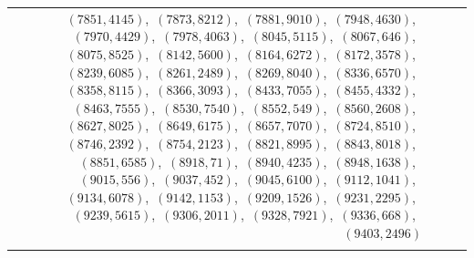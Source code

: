 \documentclass[11pt]{article}
\begin{document}
\begin{longtable}{@{}rrl>{\raggedright\arraybackslash}p{}@{}}
$(7851,4145)$,\allowbreak\ $(7873,8212)$,\allowbreak\ $(7881,9010)$,\allowbreak\ $(7948,4630)$,\allowbreak\ $(7970,4429)$,\allowbreak\ $(7978,4063)$,\allowbreak\ $(8045,5115)$,\allowbreak\ $(8067,646)$,\allowbreak\ $(8075,8525)$,\allowbreak\ $(8142,5600)$,\allowbreak\ $(8164,6272)$,\allowbreak\ $(8172,3578)$,\allowbreak\ $(8239,6085)$,\allowbreak\ $(8261,2489)$,\allowbreak\ $(8269,8040)$,\allowbreak\ $(8336,6570)$,\allowbreak\ $(8358,8115)$,\allowbreak\ $(8366,3093)$,\allowbreak\ $(8433,7055)$,\allowbreak\ $(8455,4332)$,\allowbreak\ $(8463,7555)$,\allowbreak\ $(8530,7540)$,\allowbreak\ $(8552,549)$,\allowbreak\ $(8560,2608)$,\allowbreak\ $(8627,8025)$,\allowbreak\ $(8649,6175)$,\allowbreak\ $(8657,7070)$,\allowbreak\ $(8724,8510)$,\allowbreak\ $(8746,2392)$,\allowbreak\ $(8754,2123)$,\allowbreak\ $(8821,8995)$,\allowbreak\ $(8843,8018)$,\allowbreak\ $(8851,6585)$,\allowbreak\ $(8918,71)$,\allowbreak\ $(8940,4235)$,\allowbreak\ $(8948,1638)$,\allowbreak\ $(9015,556)$,\allowbreak\ $(9037,452)$,\allowbreak\ $(9045,6100)$,\allowbreak\ $(9112,1041)$,\allowbreak\ $(9134,6078)$,\allowbreak\ $(9142,1153)$,\allowbreak\ $(9209,1526)$,\allowbreak\ $(9231,2295)$,\allowbreak\ $(9239,5615)$,\allowbreak\ $(9306,2011)$,\allowbreak\ $(9328,7921)$,\allowbreak\ $(9336,668)$,\allowbreak\ $(9403,2496)$\\
\addlinespace[3pt]

\end{longtable}
\end{document}
